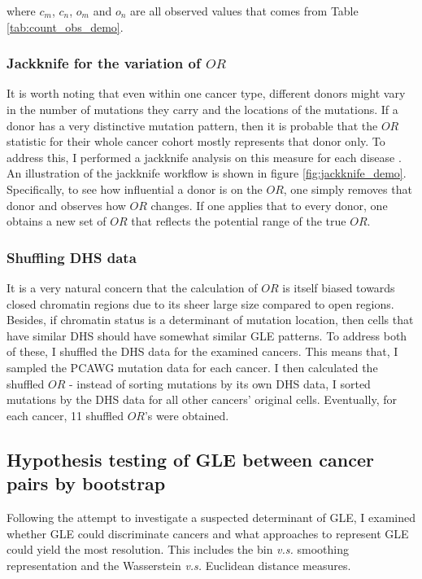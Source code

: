 where $c_m$, $c_n$, $o_m$ and $o_n$ are all observed values that comes from Table \ref{tab:count_obs_demo}.

\subsubsection{Jackknife for the variation of $OR$}
It is worth noting that even within one cancer type, different donors might vary in the number of mutations they carry and the locations of the mutations. If a donor has a very distinctive mutation pattern, then it is probable that the $OR$ statistic for their whole cancer cohort mostly represents that donor only. To address this, I performed a jackknife analysis on this measure for each disease \citep{Miller1974TheReview}. An illustration of the jackknife workflow is shown in figure \ref{fig:jackknife_demo}. Specifically, to see how influential a donor is on the $OR$, one simply removes that donor and observes how $OR$ changes. If one applies that to every donor, one obtains a new set of $OR$ that reflects the potential range of the true $OR$.



\subsubsection{Shuffling DHS data}
It is a very natural concern that the calculation of $OR$ is itself biased towards closed chromatin regions due to its sheer large size compared to open regions. Besides, if chromatin status is a determinant of mutation location, then cells that have similar DHS should have somewhat similar GLE patterns. To address both of these, I shuffled the DHS data for the examined cancers. This means that, I sampled the PCAWG mutation data for each cancer. I then calculated the shuffled $OR$ - instead of sorting mutations by its own DHS data, I sorted mutations by the DHS data for all other cancers' original cells. Eventually, for each cancer, 11 shuffled $OR$'s were obtained. 

\subsection{Hypothesis testing of GLE between cancer pairs by bootstrap}

Following the attempt to investigate a suspected determinant of GLE, I examined whether GLE could discriminate cancers and what approaches to represent GLE could yield the most resolution. This includes the bin \textit{v.s.} smoothing representation and the Wasserstein \textit{v.s.} Euclidean distance measures. 

